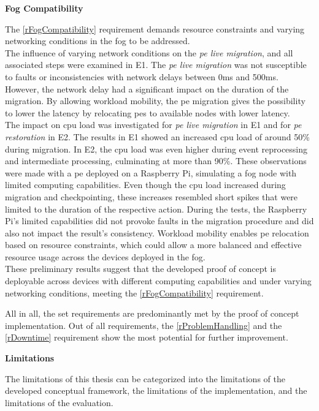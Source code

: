 \textbf{Fog Compatibility}\par
The \ref{rFogCompatibility} requirement demands resource constraints and varying networking conditions in the fog to be addressed.\\
The influence of varying network conditions on the \textit{\acrshort{pe} live migration}, and all associated steps were examined in E1. The \textit{\acrshort{pe} live migration} was not susceptible to faults or inconsistencies with network delays between 0ms and 500ms. However, the network delay had a significant impact on the duration of the migration. By allowing workload mobility, the \gls{pe} migration gives the possibility to lower the latency by relocating \gls{pe}s to available nodes with lower latency.\\
The impact on \gls{cpu} load was investigated for \textit{\acrshort{pe} live migration} in E1 and for \textit{\acrshort{pe} restoration} in E2. The results in E1 showed an increased \gls{cpu} load of around 50\% during migration. In E2, the \gls{cpu} load was even higher during event reprocessing and intermediate processing, culminating at more than 90\%. These observations were made with a \gls{pe} deployed on a Raspberry Pi, simulating a fog node with limited computing capabilities. Even though the \gls{cpu} load increased during migration and checkpointing, these increases resembled short spikes that were limited to the duration of the respective action. During the tests, the Raspberry Pi's limited capabilities did not provoke faults in the migration procedure and did also not impact the result's consistency. Workload mobility enables \gls{pe} relocation based on resource constraints, which could allow a more balanced and effective resource usage across the devices deployed in the fog.\\
These preliminary results suggest that the developed proof of concept is deployable across devices with different computing capabilities and under varying networking conditions, meeting the \ref{rFogCompatibility} requirement.\par


All in all, the set requirements are predominantly met by the proof of concept implementation. Out of all requirements, the \ref{rProblemHandling} and the \ref{rDowntime} requirement show the most potential for further improvement.

\textbf{Limitations}\par

The limitations of this thesis can be categorized into the limitations of the developed conceptual framework, the limitations of the implementation, and the limitations of the evaluation.\par


